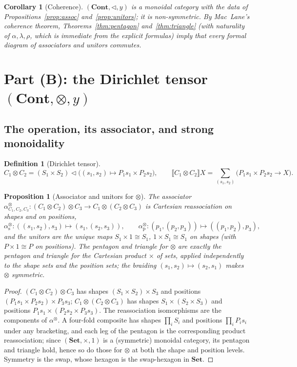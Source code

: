\documentclass[11pt]{article}
\newtheorem{proposition}{Proposition}
\newtheorem{corollary}{Corollary}
\theoremstyle{definition}
\newtheorem{definition}{Definition}
\newcommand{\Set}{\mathbf{Set}}
\newcommand{\Cont}{\mathbf{Cont}}
\newcommand{\ext}[1]{\llbracket #1 \rrbracket}
\newcommand{\tri}{\mathbin{\triangleleft}}
\newcommand{\dir}{\mathbin{\otimes}}
\begin{document}
\begin{corollary}[Coherence]\label{cor:coherence-seq}
$(\Cont,\tri,y)$ is a monoidal category with the data of
Propositions~\ref{prop:assoc} and~\ref{prop:unitors}; it is non-symmetric. By
Mac~Lane's coherence theorem, Theorems~\ref{thm:pentagon}
and~\ref{thm:triangle} (with naturality of $\alpha,\lambda,\rho$, which is
immediate from the explicit formulas) imply that every formal diagram of
associators and unitors commutes.
\end{corollary}

\section{Part (B): the Dirichlet tensor $(\Cont,\dir,y)$}

\subsection{The operation, its associator, and strong monoidality}

\begin{definition}[Dirichlet tensor]\label{def:dir}
\[
  C_1\dir C_2=(S_1\times S_2)\tri\bigl((s_1,s_2)\mapsto P_1 s_1\times P_2 s_2\bigr),
  \qquad
  \ext{C_1\dir C_2}X=\sum_{(s_1,s_2)}\bigl(P_1 s_1\times P_2 s_2\to X\bigr).
\]
\end{definition}

\begin{proposition}[Associator and unitors for $\dir$]\label{prop:dir-assoc}
The associator $\alpha^{\dir}_{C_1,C_2,C_3}\colon (C_1\dir C_2)\dir C_3\to
C_1\dir(C_2\dir C_3)$ is Cartesian reassociation on shapes and on positions,
\[
  \alpha^{\dir}_{\mathrm s}\colon ((s_1,s_2),s_3)\mapsto(s_1,(s_2,s_3)),
  \qquad
  \alpha^{\dir}_{\mathrm p}\colon (p_1,(p_2,p_3))\mapsto((p_1,p_2),p_3),
\]
and the unitors are the unique maps $S_1\times 1\cong S_1$,
$1\times S_1\cong S_1$ on shapes (with $P\times 1\cong P$ on positions). The
pentagon and triangle for $\dir$ are exactly the pentagon and triangle for the
Cartesian product $\times$ of sets, applied independently to the shape sets and
the position sets; the braiding $(s_1,s_2)\mapsto(s_2,s_1)$ makes $\dir$
symmetric.
\end{proposition}

\begin{proof}
$(C_1\dir C_2)\dir C_3$ has shapes $(S_1\times S_2)\times S_3$ and positions
$(P_1 s_1\times P_2 s_2)\times P_3 s_3$; $C_1\dir(C_2\dir C_3)$ has shapes
$S_1\times(S_2\times S_3)$ and positions $P_1 s_1\times(P_2 s_2\times P_3 s_3)$.
The reassociation isomorphisms are the components of $\alpha^{\dir}$. A
four-fold composite has shapes $\prod_i S_i$ and positions $\prod_i P_i s_i$
under any bracketing, and each leg of the pentagon is the corresponding product
reassociation; since $(\Set,\times,1)$ is a (symmetric) monoidal category, its
pentagon and triangle hold, hence so do those for $\dir$ at both the shape and
position levels. Symmetry is the swap, whose hexagon is the swap-hexagon in
$\Set$.
\end{proof}
\end{document}
